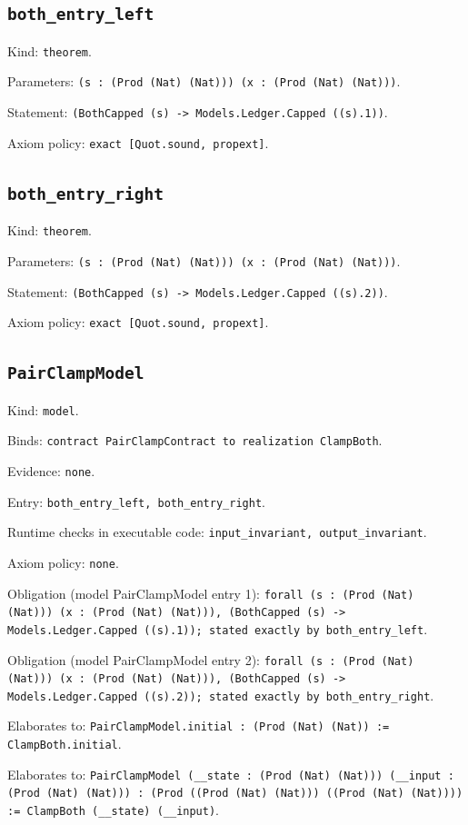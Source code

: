 \documentclass[11pt]{article}
\begin{document}
\subsection*{\texttt{both\_entry\_left}}
\noindent Kind: \texttt{theorem}.\par
\noindent Parameters: \texttt{(s : (Prod (Nat) (Nat))) (x : (Prod (Nat) (Nat)))}.\par
\noindent Statement: \texttt{(BothCapped (s) -> Models.Ledger.Capped ((s).1))}.\par
\noindent Axiom policy: \texttt{exact [Quot.sound, propext]}.\par
\subsection*{\texttt{both\_entry\_right}}
\noindent Kind: \texttt{theorem}.\par
\noindent Parameters: \texttt{(s : (Prod (Nat) (Nat))) (x : (Prod (Nat) (Nat)))}.\par
\noindent Statement: \texttt{(BothCapped (s) -> Models.Ledger.Capped ((s).2))}.\par
\noindent Axiom policy: \texttt{exact [Quot.sound, propext]}.\par
\subsection*{\texttt{PairClampModel}}
\noindent Kind: \texttt{model}.\par
\noindent Binds: \texttt{contract PairClampContract to realization ClampBoth}.\par
\noindent Evidence: \texttt{none}.\par
\noindent Entry: \texttt{both\_entry\_left, both\_entry\_right}.\par
\noindent Runtime checks in executable code: \texttt{input\_invariant, output\_invariant}.\par
\noindent Axiom policy: \texttt{none}.\par
\noindent Obligation (model PairClampModel entry 1): \texttt{forall (s : (Prod (Nat) (Nat))) (x : (Prod (Nat) (Nat))), (BothCapped (s) -> Models.Ledger.Capped ((s).1)); stated exactly by both\_entry\_left}.\par
\noindent Obligation (model PairClampModel entry 2): \texttt{forall (s : (Prod (Nat) (Nat))) (x : (Prod (Nat) (Nat))), (BothCapped (s) -> Models.Ledger.Capped ((s).2)); stated exactly by both\_entry\_right}.\par
\noindent Elaborates to: \texttt{PairClampModel.initial : (Prod (Nat) (Nat)) := ClampBoth.initial}.\par
\noindent Elaborates to: \texttt{PairClampModel (\_\_state : (Prod (Nat) (Nat))) (\_\_input : (Prod (Nat) (Nat))) : (Prod ((Prod (Nat) (Nat))) ((Prod (Nat) (Nat)))) := ClampBoth (\_\_state) (\_\_input)}.\par
\end{document}
